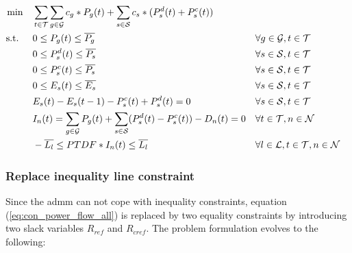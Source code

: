 \begin{subequations}
	\begin{align}
		 \min \quad & \sum_{t\in\mathcal{T}}\sum_{g\in\mathcal{G}}c_g*P_g(t) + \sum_{s\in\mathcal{S}}c_s*(P_s^d(t)+P_s^c(t))\\
		 \text{s.t. } \quad & 0 \leq P_g(t) \leq \overline{P_g} && \forall g \in \mathcal{G}, t \in \mathcal{T}\\
		 & 0 \leq P_s^d(t) \leq \overline{P_s} && \forall s \in \mathcal{S}, t \in \mathcal{T}\\
		 & 0 \leq P_s^c(t) \leq \overline{P_s} && \forall s \in \mathcal{S}, t \in \mathcal{T}\\
		 & 0 \leq E_s(t) \leq \overline{E_s} && \forall s \in \mathcal{S}, t \in \mathcal{T}\\
		 & E_s(t) - E_s(t-1) - P_s^c(t) + P_s^d(t) = 0 && \forall s \in \mathcal{S}, t \in \mathcal{T}\\
		 & I_n(t) = \sum_{g\in\mathcal{G}}P_g(t) + \sum_{s\in\mathcal{S}}(P_s^d(t)-P_s^c(t))-D_n(t) = 0 && \forall t \in \mathcal{T}, n \in \mathcal{N}\\
		 & -\overline{L_l} \leq PTDF * I_n(t) \leq \overline{L_l} && \forall l \in \mathcal{L}, t \in \mathcal{T}, n \in \mathcal{N} \label{eq:con_power_flow_all}
	\end{align}
\end{subequations}

\subsubsection{Replace inequality line constraint}

Since the \gls{admm} can not cope with inequality constraints, equation (\ref{eq:con_power_flow_all}) is replaced by two equality constraints by introducing two slack variables $R_{ref}$ and $R_{cref}$. The problem formulation evolves to the following:

